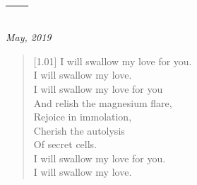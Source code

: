 \section*{---}

\hfill\textit{May, 2019}

\begin{verse}[1.01\textwidth]
    I will swallow my love for you.\\
    I will swallow my love.\\
    I will swallow my love for you\\
    And relish the magnesium flare,\\
    Rejoice in immolation,\\
    Cherish the autolysis\\
    Of secret cells.\\
    I will swallow my love for you.\\
    I will swallow my love.
\end{verse}
\newpage
